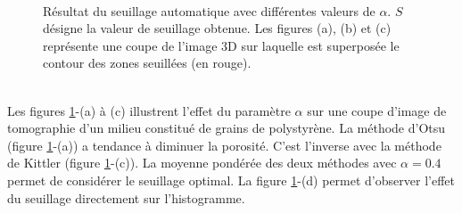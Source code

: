 			\begin{figure}\centering
				\hfill
				\hfill
				\\
				\caption{\label{fig04:seuillage_polystyrene}Résultat du seuillage automatique avec différentes valeurs de $\alpha$. $S$ désigne la valeur de seuillage obtenue. Les figures (a), (b) et (c) représente une coupe de l'image 3D sur laquelle est superposée le contour des zones seuillées (en rouge).}
			\end{figure}
			\\Les figures \ref{fig04:seuillage_polystyrene}-(a) à (c) illustrent l'effet du paramètre $\alpha$ sur une coupe d'image de tomographie d'un milieu constitué de grains de polystyrène. La méthode d'Otsu (figure \ref{fig04:seuillage_polystyrene}-(a)) a tendance à diminuer la porosité. C'est l'inverse avec la méthode de Kittler (figure \ref{fig04:seuillage_polystyrene}-(c)). La moyenne pondérée des deux méthodes avec $\alpha=0.4$ permet de considérer le seuillage optimal. La figure \ref{fig04:seuillage_polystyrene}-(d) permet d'observer l'effet du seuillage directement sur l'histogramme.
